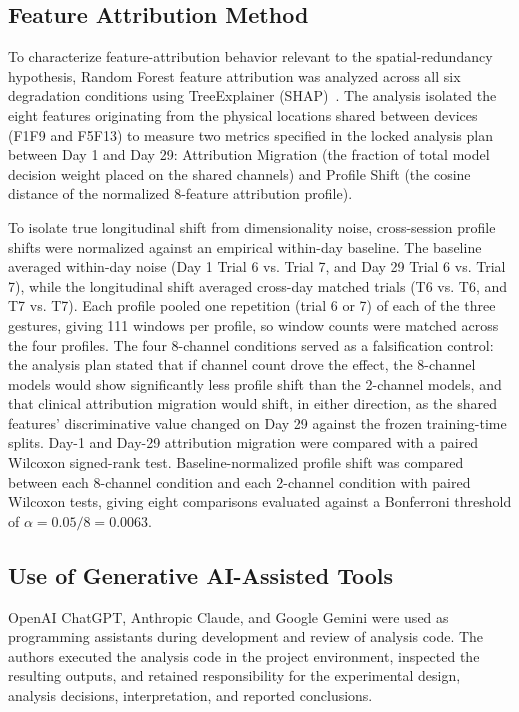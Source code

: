 \documentclass[preprint,12pt]{elsarticle}
\begin{document}
\subsection{Feature Attribution Method}
To characterize feature-attribution behavior relevant to the spatial-redundancy hypothesis, Random Forest feature attribution was analyzed across all six degradation conditions using TreeExplainer (SHAP)~\cite{lundberg2017unifiedapproachinterpretingmodel,Lundberg2020trees}. The analysis isolated the eight features originating from the physical locations shared between devices (F1F9 and F5F13) to measure two metrics specified in the locked analysis plan between Day 1 and Day 29: Attribution Migration (the fraction of total model decision weight placed on the shared channels) and Profile Shift (the cosine distance of the normalized 8-feature attribution profile).

To isolate true longitudinal shift from dimensionality noise, cross-session profile shifts were normalized against an empirical within-day baseline. The baseline averaged within-day noise (Day 1 Trial 6 vs. Trial 7, and Day 29 Trial 6 vs. Trial 7), while the longitudinal shift averaged cross-day matched trials (T6 vs. T6, and T7 vs. T7). Each profile pooled one repetition (trial 6 or 7) of each of the three gestures, giving 111 windows per profile, so window counts were matched across the four profiles. The four 8-channel conditions served as a falsification control: the analysis plan stated that if channel count drove the effect, the 8-channel models would show significantly less profile shift than the 2-channel models, and that clinical attribution migration would shift, in either direction, as the shared features' discriminative value changed on Day 29 against the frozen training-time splits. Day-1 and Day-29 attribution migration were compared with a paired Wilcoxon signed-rank test. Baseline-normalized profile shift was compared between each 8-channel condition and each 2-channel condition with paired Wilcoxon tests, giving eight comparisons evaluated against a Bonferroni threshold of $\alpha = 0.05/8 = 0.0063$.

\subsection{Use of Generative AI-Assisted Tools}
OpenAI ChatGPT, Anthropic Claude, and Google Gemini were used as programming assistants during development and review of analysis code. The authors executed the analysis code in the project environment, inspected the resulting outputs, and retained responsibility for the experimental design, analysis decisions, interpretation, and reported conclusions.
\end{document}
